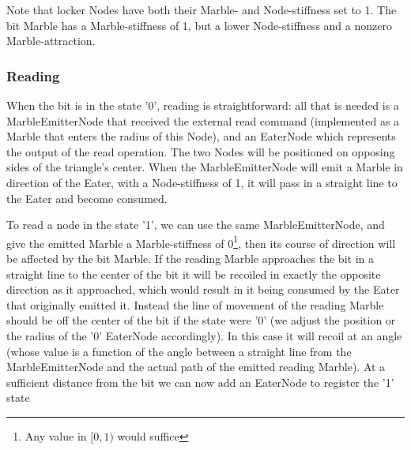 Note that locker Nodes have both their Marble- and Node-stiffness set to 1. The bit Marble has a Marble-stiffness of 1, but a lower Node-stiffness and a nonzero Marble-attraction.

\subsubsection{Reading}
When the bit is in the state '0', reading is straightforward:
all that is needed is a MarbleEmitterNode that received the external read command (implemented as a Marble that enters the radius of this Node), and an EaterNode which represents the output of the read operation. The two Nodes will be positioned on opposing sides of the triangle's center. When the MarbleEmitterNode will emit a Marble in direction of the Eater, with a Node-stiffness of 1, it will pass in a straight line to the Eater and become consumed.

To read a node in the state '1', we can use the same MarbleEmitterNode, and give the emitted Marble a Marble-stiffness of 0\footnote{Any value in $[0, 1)$ would suffice}, then its course of direction will be affected by the bit Marble. If the reading Marble approaches the bit in a straight line to the center of the bit it will be recoiled in exactly the opposite direction as it approached, which would result in it being consumed by the Eater that originally emitted it. Instead the line of movement of the reading Marble should be off the center of the bit if the state were '0' (we adjust the position or the radius of the '0' EaterNode accordingly). In this case it will recoil at an angle (whose value is a function of the angle between a straight line from the MarbleEmitterNode and the actual path of the emitted reading Marble). At a sufficient distance from the bit we can now add an EaterNode to register the '1' state